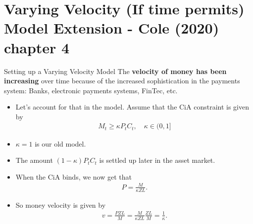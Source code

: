 \documentclass[10pt,c,aspectratio=1610,handout]{beamer}
\begin{document}
\section{Varying Velocity {\small (If time permits)}\\\small{Model Extension - Cole (2020) chapter 4}}%
\begin{frame}{Setting up a Varying Velocity Model}%
  The \textbf{velocity of money has been increasing} over time because of the increased sophistication in the payments system: Banks, electronic payments systems, FinTec, etc.%
  \pause%
  \begin{itemize}%
    \item[$\blacktriangleright$] Let's account for that in the model. Assume that the CiA constraint is given by%
      \begin{align*}%
        M_{t} \geq \kappa P_{t} C_{t}, \quad \kappa \in (0,1]%
      \end{align*}%
    \item[$\blacktriangleright$] $\kappa = 1$ is our old model.%
    \item[$\blacktriangleright$] The amount $(1-\kappa) P_{t} C_{t} $ is settled up later in the asset market.%
    \pause%
    \item[$\blacktriangleright$] When the CiA binds, we now get that%
      \begin{align*}%
        P = \frac{M}{\kappa Z L}.%
      \end{align*}%
    \item[$\blacktriangleright$] So money velocity is given by%
      \begin{align*}%
        v = \frac{P Z L}{M}=\frac{M}{\kappa Z L}\frac{Z L}{M} = \frac{1}{\kappa}.%
      \end{align*}%
  \end{itemize}%
\end{frame}%
\end{document}
